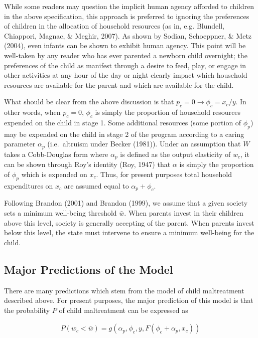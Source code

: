 \documentclass[review]{elsarticle}\usepackage[]{graphicx}\usepackage[]{color}
\begin{document}
While some readers may question the implicit human agency afforded to
children in the above specification, this approach is preferred to
ignoring the preferences of children in the allocation of household
resources (as in, e.g. Blundell, Chiappori, Magnac, \& Meghir, 2007). As
shown by Sodian, Schoeppner, \& Metz (2004), even infants can be shown
to exhibit human agency. This point will be well-taken by any reader who
has ever parented a newborn child overnight; the preferences of the
child as manifest through a desire to feed, play, or engage in other
activities at any hour of the day or night clearly impact which
household resources are available for the parent and which are available
for the child.

What should be clear from the above discussion is that
$p_c=0 \rightarrow \phi_c=x_c/y$. In other words, when $p_c=0$, $\phi_c$
is simply the proportion of household resources expended on the child in
stage 1. Some additional resources (some portion of $\phi_p$) may be
expended on the child in stage 2 of the program according to a caring
parameter $\alpha_p$ (i.e.~altruism under Becker (1981)). Under an
assumption that $W$ takes a Cobb-Douglas form where $\alpha_p$ is
defined as the output elasticity of $w_c$, it can be shown through Roy's
identity (Roy, 1947) that $\alpha$ is simply the proportion of $\phi_p$
which is expended on $x_c$. Thus, for present purposes total household
expenditures on $x_c$ are assumed equal to $\alpha_p + \phi_c$.

Following Brandon (2001) and Brandon (1999), we assume that a given
society sets a minimum well-being threshold $\bar{w}$. When parents
invest in their children above this level, society is generally
accepting of the parent. When parents invest below this level, the state
must intervene to ensure a minimum well-being for the child.

\subsection{Major Predictions of the
Model}\label{major-predictions-of-the-model}

There are many predictions which stem from the model of child
maltreatment described above. For present purposes, the major prediction
of this model is that the probability $P$ of child maltreatment can be
expressed as

\begin{align}\label{eqn:prediction}
P(w_c < \bar{w})=g(\alpha_p, \phi_c, y, F(\phi_c + \alpha_p, x_c))
\end{align}
\end{document}
